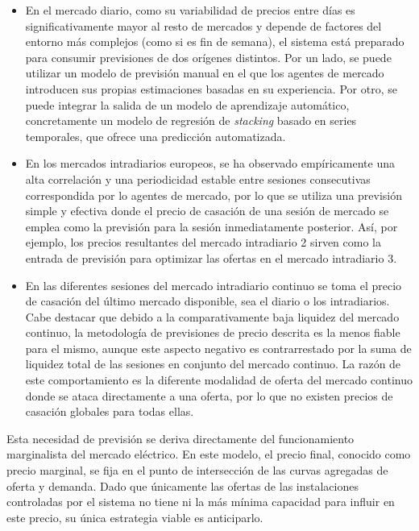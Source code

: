 \begin{itemize}

\item En el mercado diario, como su variabilidad de precios entre días es significativamente mayor al resto de mercados y depende de factores del entorno más complejos (como si es fin de semana), el sistema está preparado para consumir previsiones de dos orígenes distintos. Por un lado, se puede utilizar un modelo de previsión manual en el que los agentes de mercado introducen sus propias estimaciones basadas en su experiencia. Por otro, se puede integrar la salida de un modelo de aprendizaje automático, concretamente un modelo de regresión de \textit{stacking} basado en series temporales, que ofrece una predicción automatizada.

\item En los mercados intradiarios europeos, se ha observado empíricamente una alta correlación y una periodicidad estable entre sesiones consecutivas correspondida por lo agentes de mercado, por lo que se utiliza una previsión simple y efectiva donde el precio de casación de una sesión de mercado se emplea como la previsión para la sesión inmediatamente posterior. Así, por ejemplo, los precios resultantes del mercado intradiario 2 sirven como la entrada de previsión para optimizar las ofertas en el mercado intradiario 3.

\item En las diferentes sesiones del mercado intradiario continuo se toma el precio de casación del último mercado disponible, sea el diario o los intradiarios. Cabe destacar que debido a la comparativamente baja liquidez del mercado continuo, la metodología de previsiones de precio descrita es la menos fiable para el mismo, aunque este aspecto negativo es contrarrestado por la suma de liquidez total de las sesiones en conjunto del mercado continuo. La razón de este comportamiento es la diferente modalidad de oferta del mercado continuo donde se ataca directamente a una oferta, por lo que no existen precios de casación globales para todas ellas.

\end{itemize}

Esta necesidad de previsión se deriva directamente del funcionamiento marginalista del mercado eléctrico. En este modelo, el precio final, conocido como precio marginal, se fija en el punto de intersección de las curvas agregadas de oferta y demanda. Dado que únicamente las ofertas de las instalaciones controladas por el sistema no tiene ni la más mínima capacidad para influir en este precio, su única estrategia viable es anticiparlo.

